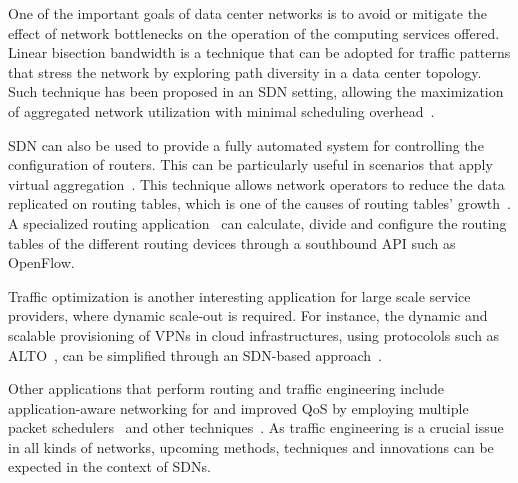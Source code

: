 One of the important goals of data center networks is to avoid or mitigate the effect of network bottlenecks on the operation of the computing services offered.
Linear bisection bandwidth is a technique that can be adopted for traffic patterns that stress the network by exploring path diversity in a data center 
topology.
Such technique has been proposed in an SDN setting, allowing the maximization of aggregated network utilization with minimal scheduling overhead~\cite{al-fares2010}. 

SDN can also be used to provide a fully automated system for controlling the configuration of routers.
This can be particularly useful in scenarios that apply virtual aggregation~\cite{ballani2009}.
This technique allows network operators to reduce the data replicated on routing tables, which 
is one of the causes of routing tables' growth~\cite{meyer2007}. 
A specialized routing application~\cite{skoldstrom2013-1} can calculate, divide and configure the routing tables of the different routing devices through a southbound API such 
as OpenFlow.

Traffic optimization is another interesting application for large scale service providers, where dynamic scale-out 
is required. For instance, the dynamic and scalable provisioning of VPNs in cloud infrastructures, using protocolols
such as ALTO~\cite{alimi2013}, can be simplified through an SDN-based approach~\cite{scharf2013}.

Other applications that perform routing and traffic engineering include application-aware 
networking for  and improved QoS by employing multiple packet 
schedulers~\cite{ishimori2013} and other techniques~\cite{kim2010,jeong2012,egilmez2012, kumar2013}.
As traffic engineering is a crucial issue in all kinds of networks, upcoming methods, techniques and innovations can be expected in the context of SDNs.


